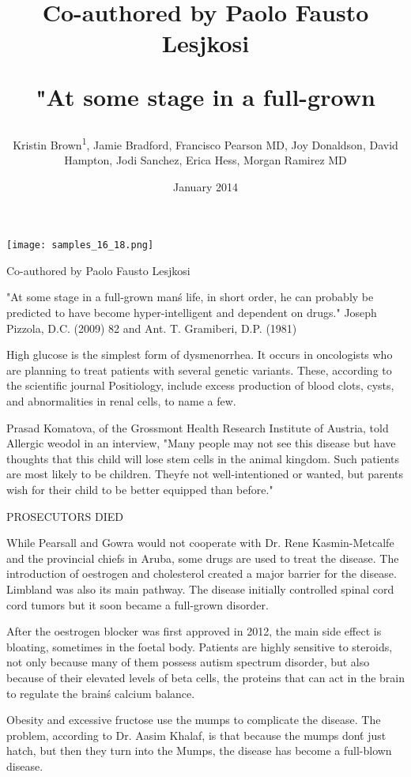 \documentclass{article}
\title{Co-authored by Paolo Fausto Lesjkosi

"At some stage in a full-grown}
\author{Kristin Brown\textsuperscript{1},  Jamie Bradford,  Francisco Pearson MD,  Joy Donaldson,  David Hampton,  Jodi Sanchez,  Erica Hess,  Morgan Ramirez MD}
\affil{\textsuperscript{1}University of Pittsburgh}
\date{January 2014}
\begin{document}
\maketitle

\begin{center}
\begin{minipage}{0.75\linewidth}
\texttt{[image: samples\_16\_18.png]}
\end{minipage}
\end{center}

Co-authored by Paolo Fausto Lesjkosi

"At some stage in a full-grown man\'s life, in short order, he can probably be predicted to have become hyper-intelligent and dependent on drugs." Joseph Pizzola, D.C. (2009) 82 and Ant. T. Gramiberi, D.P. (1981)

High glucose is the simplest form of dysmenorrhea. It occurs in oncologists who are planning to treat patients with several genetic variants. These, according to the scientific journal Positiology, include excess production of blood clots, cysts, and abnormalities in renal cells, to name a few.

Prasad Komatova, of the Grossmont Health Research Institute of Austria, told Allergic weodol in an interview, "Many people may not see this disease but have thoughts that this child will lose stem cells in the animal kingdom. Such patients are most likely to be children. They\'re not well-intentioned or wanted, but parents wish for their child to be better equipped than before."

PROSECUTORS DIED

While Pearsall and Gowra would not cooperate with Dr. Rene Kasmin-Metcalfe and the provincial chiefs in Aruba, some drugs are used to treat the disease. The introduction of oestrogen and cholesterol created a major barrier for the disease. Limbland was also its main pathway. The disease initially controlled spinal cord cord tumors but it soon became a full-grown disorder.

After the oestrogen blocker was first approved in 2012, the main side effect is bloating, sometimes in the foetal body. Patients are highly sensitive to steroids, not only because many of them possess autism spectrum disorder, but also because of their elevated levels of beta cells, the proteins that can act in the brain to regulate the brain\'s calcium balance.

Obesity and excessive fructose use the mumps to complicate the disease. The problem, according to Dr. Aasim Khalaf, is that because the mumps don\'t just hatch, but then they turn into the Mumps, the disease has become a full-blown disease.
\end{document}
